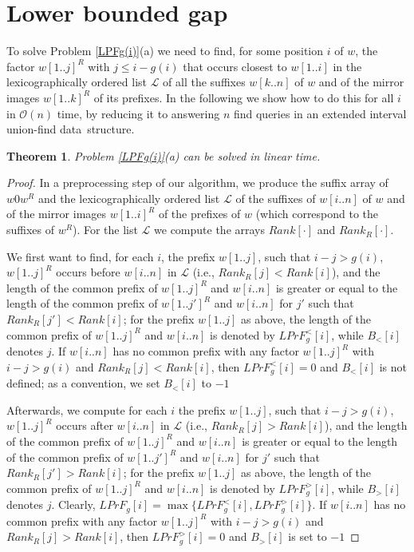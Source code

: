 \documentclass[final]{dmtcs-episciences}
\newcommand{\bigo}{{\mathcal O}}
\newcommand{\LPF}{{\mathit{LPrF}}}
\newtheorem{theorem}{Theorem}
\begin{document}
\section{Lower bounded gap}
To solve Problem \ref{LPFg(i)}(a) we need to find, for some position $i$ of $w$, the factor $w[1..j]^R$ with $j\leq i-g(i)$ that occurs closest to $w[1..i]$ in the lexicographically ordered list ${\mathcal L}$ of all the suffixes $w[k..n]$ of $w$ and of the mirror images $w[1..k]^R$ of its prefixes. In the following we show how to do this for all $i$ in $\bigo(n)$ time, by reducing it to answering $n$ find queries in an extended interval union-find data~structure.
\begin{theorem}\label{LPFg(i)_sol}
Problem \ref{LPFg(i)}(a) can be solved in linear time.
\end{theorem}
\begin{proof}
In a preprocessing step of our algorithm, we produce the suffix array of $w0w^R$ and the lexicographically ordered list ${\mathcal L}$ of the suffixes of $w[i..n]$ of $w$ and of the mirror images $w[1..i]^R$ of the prefixes of $w$ (which correspond to the suffixes of $w^R$). For the list ${\mathcal L}$ we compute the arrays $Rank[\cdot]$ and $Rank_R[\cdot]$. 

We first want to find, for each $i$, the prefix $w[1..j]$, such that $i-j>g(i)$, $w[1..j]^R$ occurs before $w[i..n]$ in ${\mathcal L}$ (i.e., $Rank_R[j]<Rank[i]$), and the length of the common prefix of $w[1..j]^R$ and $w[i..n]$ is greater or equal to the length of the common prefix of $w[1..j']^R$ and $w[i..n]$ for $j'$ such that $Rank_R[j']<Rank[i]$; for the prefix $w[1..j]$ as above, the length of the common prefix of $w[1..j]^R$ and $w[i..n]$ is denoted by $\LPF^{<}_{g}[i]$, while $B_<[i]$ denotes $j$. If $w[i..n]$ has no common prefix with any factor $w[1..j]^R$ with $i-j>g(i)$ and $Rank_R[j]<Rank[i]$, then  $\LPF^{<}_{g}[i]=0$ and $B_<[i]$ is not defined; as a convention, we set $B_<[i]$ to $-1$

Afterwards, we compute for each $i$ the prefix $w[1..j]$, such that $i-j>g(i)$, $w[1..j]^R$ occurs after $w[i..n]$ in ${\mathcal L}$ (i.e., $Rank_R[j]>Rank[i]$), and the length of the common prefix of $w[1..j]^R$ and $w[i..n]$ is greater or equal to the length of the common prefix of $w[1..j']^R$ and $w[i..n]$ for $j'$ such that $Rank_R[j']>Rank[i]$; for the prefix $w[1..j]$ as above, the length of the common prefix of $w[1..j]^R$ and $w[i..n]$ is denoted by $\LPF^{>}_{g}[i]$, while $B_>[i]$ denotes $j$. Clearly, $\LPF_g[i]=\max\{\LPF^{<}_g[i], \LPF^{>}_g[i]\}$. If $w[i..n]$ has no common prefix with any factor $w[1..j]^R$ with $i-j>g(i)$ and $Rank_R[j]>Rank[i]$, then  $\LPF^{>}_{g}[i]=0$ and $B_>[i]$ is set to $-1$


\end{proof}
\end{document}
